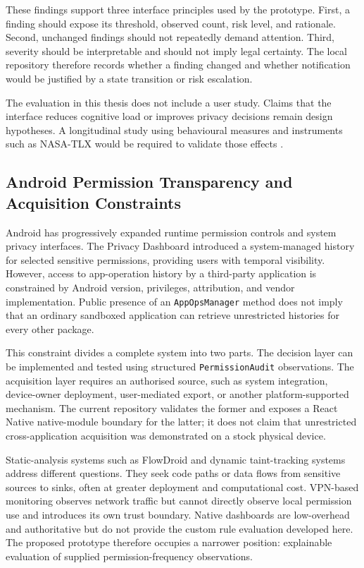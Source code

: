 These findings support three interface principles used by the prototype. First, a finding should expose its threshold, observed count, risk level, and rationale. Second, unchanged findings should not repeatedly demand attention. Third, severity should be interpretable and should not imply legal certainty. The local repository therefore records whether a finding changed and whether notification would be justified by a state transition or risk escalation.

The evaluation in this thesis does not include a user study. Claims that the interface reduces cognitive load or improves privacy decisions remain design hypotheses. A longitudinal study using behavioural measures and instruments such as NASA-TLX would be required to validate those effects \cite{6}.

\subsection{Android Permission Transparency and Acquisition Constraints}

Android has progressively expanded runtime permission controls and system privacy interfaces. The Privacy Dashboard introduced a system-managed history for selected sensitive permissions, providing users with temporal visibility. However, access to app-operation history by a third-party application is constrained by Android version, privileges, attribution, and vendor implementation. Public presence of an \texttt{AppOpsManager} method does not imply that an ordinary sandboxed application can retrieve unrestricted histories for every other package.

This constraint divides a complete system into two parts. The decision layer can be implemented and tested using structured \texttt{PermissionAudit} observations. The acquisition layer requires an authorised source, such as system integration, device-owner deployment, user-mediated export, or another platform-supported mechanism. The current repository validates the former and exposes a React Native native-module boundary for the latter; it does not claim that unrestricted cross-application acquisition was demonstrated on a stock physical device.

Static-analysis systems such as FlowDroid and dynamic taint-tracking systems address different questions. They seek code paths or data flows from sensitive sources to sinks, often at greater deployment and computational cost. VPN-based monitoring observes network traffic but cannot directly observe local permission use and introduces its own trust boundary. Native dashboards are low-overhead and authoritative but do not provide the custom rule evaluation developed here. The proposed prototype therefore occupies a narrower position: explainable evaluation of supplied permission-frequency observations.

